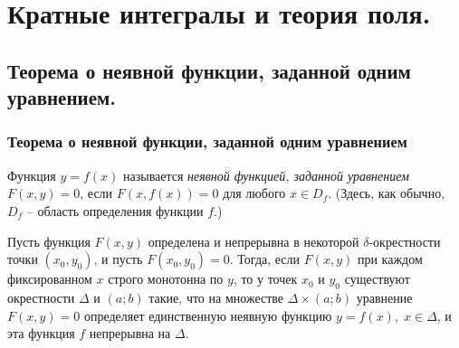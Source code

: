 \part[Кратные интегралы и теория поля.]{Кратные интегралы и теория поля.}%
\chapter{Теорема о неявной функции, заданной одним уравнением.}
\section{Теорема о неявной функции, заданной одним уравнением}
\begin{defn}
Функция $y=f(x)$ называется \textit{неявной функцией, заданной уравнением} $F(x,y)=0$, если $F(x,f(x))=0$ для любого $x\in D_f$. (Здесь, как обычно, $D_f$ -- область определения функции $f$.)
\end{defn}

\begin{thm}\label{yaa14th1}
Пусть функция $F(x,y)$ определена и непрерывна в некоторой $\delta$-окрестности точки $(x_0,y_0)$, и пусть $F(x_0,y_0)=0$. Тогда, если $F(x,y)$ при каждом фиксированном $x$ строго монотонна по $y$, то у точек $x_0$ и $y_0$ существуют окрестности $\Delta$ и $(a;b)$ такие, что на множестве $\Delta\times(a;b)$ уравнение $F(x,y)=0$ определяет единственную неявную функцию $y=f(x),\; x\in\Delta$, и эта функция  $f$ непрерывна на $\Delta$. 
\end{thm}

